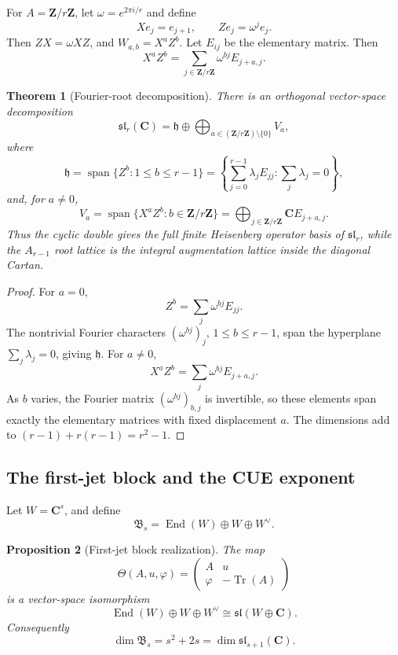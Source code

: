 \documentclass[11pt]{article}
\newcommand{\C}{\mathbf C}
\newcommand{\Z}{\mathbf Z}
\newcommand{\Tr}{\operatorname{Tr}}
\newcommand{\End}{\operatorname{End}}
\newcommand{\Span}{\operatorname{span}}
\theoremstyle{plain}
\newtheorem{theorem}{Theorem}[section]
\newtheorem{proposition}[theorem]{Proposition}
\theoremstyle{definition}
\numberwithin{equation}{section}
\begin{document}
For \(A=\Z/r\Z\), let \(\omega=e^{2\pi i/r}\) and define
\[
 Xe_j=e_{j+1},
 \qquad
 Ze_j=\omega^j e_j.
\]
Then \(ZX=\omega XZ\), and \(W_{a,b}=X^aZ^b\).  Let \(E_{ij}\) be the elementary matrix.  Then
\[
 X^aZ^b=\sum_{j\in\Z/r\Z}\omega^{bj}E_{j+a,j}.
\]

\begin{theorem}[Fourier-root decomposition]\label{thm:root-decomp}
There is an orthogonal vector-space decomposition
\[
 \mathfrak{sl}_r(\C)=\mathfrak h\oplus\bigoplus_{a\in(\Z/r\Z)\setminus\{0\}}V_a,
\]
where
\[
 \mathfrak h=\Span\{Z^b:1\le b\le r-1\}
 =\left\{\sum_{j=0}^{r-1}\lambda_jE_{jj}:\sum_j\lambda_j=0\right\},
\]
and, for \(a\ne0\),
\[
 V_a=\Span\{X^aZ^b:b\in\Z/r\Z\}
 =\bigoplus_{j\in\Z/r\Z}\C E_{j+a,j}.
\]
Thus the cyclic double gives the full finite Heisenberg operator basis of \(\mathfrak{sl}_r\), while the \(A_{r-1}\) root lattice is the integral augmentation lattice inside the diagonal Cartan.
\end{theorem}

\begin{proof}
For \(a=0\),
\[
 Z^b=\sum_j\omega^{bj}E_{jj}.
\]
The nontrivial Fourier characters \((\omega^{bj})_j\), \(1\le b\le r-1\), span the hyperplane \(\sum_j\lambda_j=0\), giving \(\mathfrak h\).  For \(a\ne0\),
\[
 X^aZ^b=\sum_j\omega^{bj}E_{j+a,j}.
\]
As \(b\) varies, the Fourier matrix \((\omega^{bj})_{b,j}\) is invertible, so these elements span exactly the elementary matrices with fixed displacement \(a\).  The dimensions add to \((r-1)+r(r-1)=r^2-1\).
\end{proof}

\subsection{The first-jet block and the CUE exponent}

Let \(W=\C^s\), and define
\[
 \mathfrak B_s=\End(W)\oplus W\oplus W^\vee.
\]

\begin{proposition}[First-jet block realization]\label{prop:firstjet}
The map
\[
 \Theta(A,u,\varphi)=
 \begin{pmatrix}
 A & u\\
 \varphi & -\Tr(A)
 \end{pmatrix}
\]
is a vector-space isomorphism
\[
 \End(W)\oplus W\oplus W^\vee\cong\mathfrak{sl}(W\oplus\C).
\]
Consequently
\[
 \dim\mathfrak B_s=s^2+2s=\dim\mathfrak{sl}_{s+1}(\C).
\]
\end{proposition}
\end{document}
